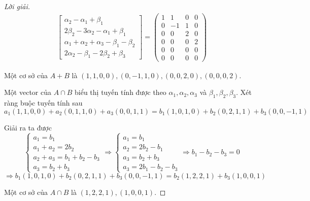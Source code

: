 \documentclass[class=linearalgebra,crop=false]{standalone}
\begin{document}
\begin{proof}[Lời giải]
\begin{align*}
\begin{bmatrix}
            \alpha_{2} - \alpha_{1} + \beta_{1}                          \\
            2\beta_{2} - 3\alpha_{2} - \alpha_{1} + \beta_{1}            \\
            \alpha_{1} + \alpha_{2} + \alpha_{3} - \beta_{1} - \beta_{2} \\
            2\alpha_{2} - \beta_{1} - 2\beta_{2} + \beta_{3}
        \end{bmatrix}=
        \begin{pmatrix}
            1 & 1  & 0 & 0 \\
            0 & -1 & 1 & 0 \\
            0 & 0  & 2 & 0 \\
            0 & 0  & 0 & 2 \\
            0 & 0  & 0 & 0 \\
            0 & 0  & 0 & 0
        \end{pmatrix}
    \end{align*}
    \par Một cơ sở của $A + B$ là $(1,1,0,0), (0,-1,1,0), (0,0,2,0), (0,0,0,2)$.
    \par Một vector của $A\cap B$ biểu thị tuyến tính được theo $\alpha_{1}, \alpha_{2}, \alpha_{3}$ và $\beta_{1}, \beta_{2}, \beta_{3}$. Xét ràng buộc tuyến tính sau
    \[ a_{1}(1,1,0,0) + a_{2}(0,1,1,0) + a_{3}(0,0,1,1) = b_{1}(1,0,1,0) + b_{2}(0,2,1,1) + b_{3}(0,0,-1,1) \]
    \par Giải ra ta được
    \[
        \begin{cases}
            a_{1} = b_{1}                         \\
            a_{1} + a_{2} = 2b_{2}                \\
            a_{2} + a_{3} = b_{1} + b_{2} - b_{3} \\
            a_{3} = b_{2} + b_{3}
        \end{cases}
        \Longrightarrow
        \begin{cases}
            a_{1} = b_{1}          \\
            a_{2} = 2b_{2} - b_{1} \\
            a_{3} = b_{2} + b_{3}  \\
            a_{3} = 2b_{1} - b_{2} - b_{3}
        \end{cases}
        \Longrightarrow
        b_{1} - b_{2} - b_{3} = 0
    \]
    \[
        \Rightarrow b_{1}(1,0,1,0) + b_{2}(0,2,1,1) + b_{3}(0,0,-1,1) = b_{2}(1,2,2,1) + b_{3}(1,0,0,1)
    \]
    \par Một cơ sở của $A\cap B$ là $(1,2,2,1), (1,0,0,1)$.
\end{proof}
\end{document}
